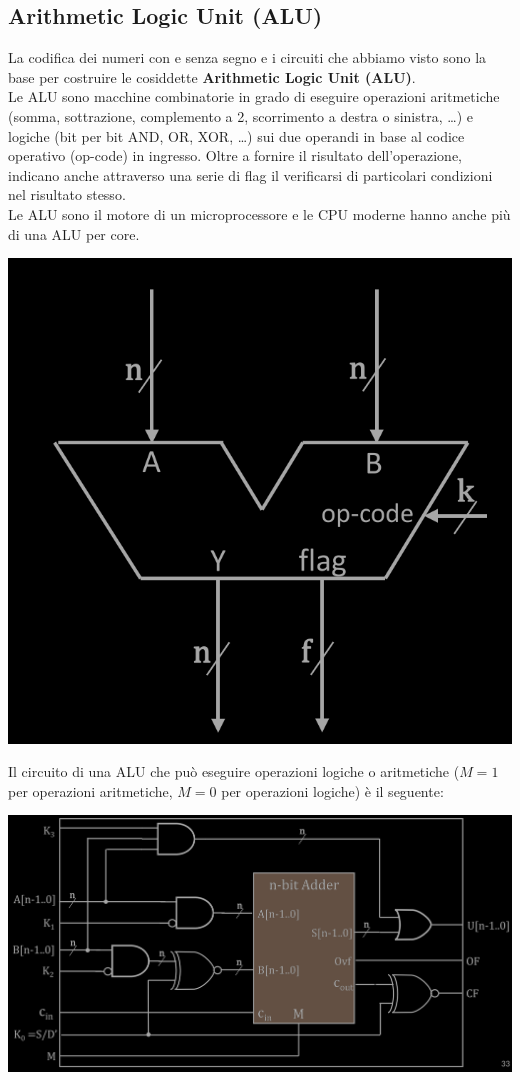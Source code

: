 \documentclass{article}
\begin{document}
\subsection{Arithmetic Logic Unit (ALU)}
La codifica dei numeri con e senza segno e i circuiti che abbiamo visto sono la base per costruire le cosiddette \textbf{\color{cyan} Arithmetic Logic Unit (ALU)}.\\
Le ALU sono macchine combinatorie in grado di eseguire operazioni aritmetiche (somma, sottrazione, complemento a 2, scorrimento a destra o sinistra, …) e logiche (bit per bit AND, OR, XOR, …) sui due operandi in base al codice operativo (op-code) in ingresso. Oltre a fornire il risultato dell’operazione, indicano anche attraverso una serie di flag il verificarsi di particolari condizioni nel risultato stesso.\\
Le ALU sono il motore di un microprocessore e le CPU moderne hanno anche più di una ALU per core.
\begin{center}
    \includegraphics[scale=0.35]{alu.png}
\end{center}
Il circuito di una ALU che può eseguire operazioni logiche o aritmetiche ($M=1$ per operazioni aritmetiche, $M=0$ per operazioni logiche) è il seguente:
\begin{center}
    \includegraphics[scale=0.35]{alu circuito.png}
\end{center}
\end{document}
